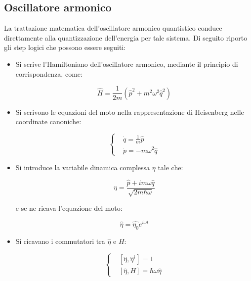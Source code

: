 \documentclass{article}
\begin{document}
\subsection{Oscillatore armonico}
La trattazione matematica dell'oscillatore armonico quantistico conduce direttamente alla quantizzazione dell'energia per tale sistema.
Di seguito riporto gli step logici che possono essere seguiti:

\begin{itemize}
    \item Si scrive l'Hamiltoniano dell'oscillatore armonico, mediante il principio di corrispondenza, come:
    
    \begin{equation}
        \hat{H}=\frac{1}{2m}(\hat{p}^2+m^2\omega^2\hat{q}^2)
    \end{equation}
    \item Si scrivono le equazioni del moto nella rappresentazione di Heisenberg nelle coordinate canoniche:
    
    \begin{equation}
        \left\{
        \begin{aligned}
            & \dot{q}=\frac{1}{m}\hat{p} \\
            & \dot{p}=-m\omega^2\hat{q}
        \end{aligned}
        \right.
    \end{equation}

    \item Si introduce la variabile dinamica complessa $\eta$ tale che:
    
    \begin{equation}
    \eta= \frac{\hat{p}+im\omega \hat{q}}{\sqrt{2m\hbar \omega}}
    \end{equation}

    e se ne ricava l'equazione del moto:

    \begin{equation}
     \hat{\eta}=\hat{\eta_0} e^{i\omega t}
    \end{equation}

    \item Si ricavano i commutatori tra $\hat{\eta}$ e $H$:
    
    \begin{equation}
        \left\{
        \begin{aligned}
            & [\hat{\eta},\hat{\eta}^{\dagger}]=1 \\
            & [\hat{\eta},H]=\hbar \omega \hat{\eta}
        \end{aligned}
        \right.
    \end{equation}


\end{itemize}
\end{document}
